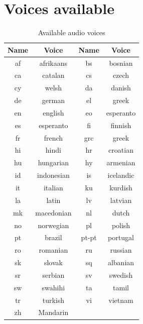 \documentclass[a4paper, 12pt]{article}  		%
\begin{document}

\section{Voices available} \label{sec:voices}

\begin{table}[H]
\begin{center}
\begin{tabular}{ | c | c | | c | c |}
\hline
Name & Voice & Name & Voice \\ 
\hline
\hline
af & afrikaans & bs & bosnian \\
\hline
ca & catalan & cs & czech \\
\hline
cy & welsh & da & danish \\
\hline
de & german & el & greek \\
\hline
en & english & eo & esperanto \\
\hline
es & esperanto & fi & finnish \\
\hline
fr & french & grc & greek \\
\hline
hi & hindi & hr & croatian \\
\hline
hu & hungarian & hy & armenian \\
\hline
id & indonesian & is & icelandic \\
\hline
it & italian & ku & kurdish \\
\hline
la & latin & lv & latvian \\
\hline
mk & macedonian & nl & dutch \\
\hline
no & norwegian & pl & polish \\
\hline
pt & brazil & pt-pt & portugal \\
\hline
ro & romanian & ru & russian \\
\hline
sk & slovak & sq & albanian \\
\hline
sr & serbian & sv & swedish \\
\hline
sw & swahihi & ta & tamil \\
\hline
tr & turkish & vi & vietnam \\
\hline
zh & Mandarin & & \\
\hline
\end{tabular}
\caption{Available audio voices}
\label{tab::voices}
\end{center}
\end{table}

\end{document}
